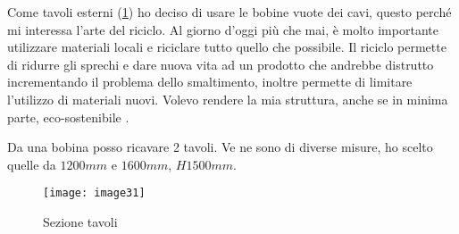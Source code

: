 Come tavoli esterni (\cref{fig:tavoli}) ho deciso di usare le bobine vuote dei cavi, questo perché mi interessa l’arte del riciclo. Al giorno d’oggi più che mai, è molto importante utilizzare materiali locali e riciclare tutto quello che possibile. Il riciclo permette di ridurre gli sprechi e  dare nuova vita ad un prodotto che andrebbe distrutto incrementando il problema dello smaltimento, inoltre permette di limitare l’utilizzo di materiali nuovi.  Volevo rendere la mia struttura, anche se in minima parte, eco-sostenibile .

Da una bobina posso ricavare 2 tavoli.  Ve ne sono di diverse misure, ho scelto quelle da  $1200 mm$ e $1600 mm$, $H 1500 mm$.

\begin{figure}[H]
	\centering
	\texttt{[image: image31]}
	\caption{Sezione tavoli}
	\label{fig:tavoli}
\end{figure}
